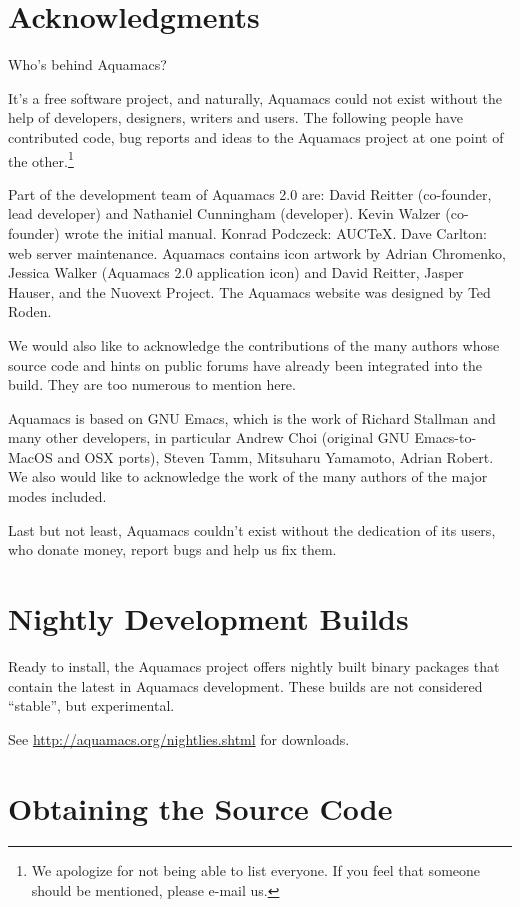 \documentclass[11pt,letterpaper]{article}
\begin{document}
\section{Acknowledgments}

Who's behind Aquamacs?

It's a free software project, and naturally, Aquamacs could not exist
without the help of developers, designers, writers and users. The
following people have contributed code, bug reports and ideas to the
Aquamacs project at one point of the other.\footnote{We apologize for not being able to list everyone.  If you feel that someone should be mentioned, please e-mail us.}

Part of the development team of Aquamacs 2.0 are:  David Reitter (co-founder, lead developer) and Nathaniel Cunningham (developer).  
Kevin Walzer (co-founder) wrote the initial manual. Konrad Podczeck: AUCTeX.  Dave Carlton: web server maintenance.  Aquamacs contains icon artwork by Adrian Chromenko, Jessica Walker (Aquamacs 2.0 application icon) and David Reitter,
Jasper Hauser, and the Nuovext Project.  The Aquamacs website was designed by Ted Roden.

We would also like to acknowledge the contributions of the many authors 
whose source code and hints on public forums have already been
integrated into the build.  They are too numerous to mention here.

Aquamacs is based on GNU Emacs, which is the work of Richard Stallman
and many other developers, in particular Andrew Choi (original GNU
Emacs-to-MacOS and OSX ports), Steven Tamm, Mitsuharu Yamamoto, Adrian Robert. We also would like to acknowledge the work
of the many authors of the major modes included.

Last but not least, Aquamacs couldn't exist without the dedication of
its users, who donate money, report bugs and help us fix them.

\section {Nightly Development Builds}

Ready to install, the Aquamacs project offers nightly built binary
packages that contain the latest in Aquamacs development. These builds
are not considered ``stable'', but experimental.

See \url{http://aquamacs.org/nightlies.shtml} for downloads.


\section {Obtaining the Source Code}
\end{document}
